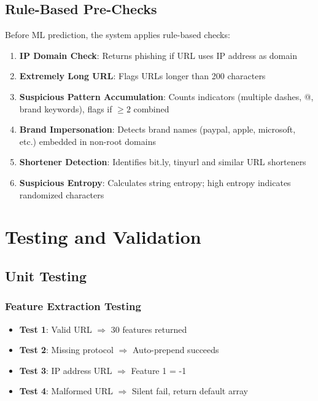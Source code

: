 \documentclass[12pt,a4paper]{report}
\begin{document}
\section{Rule-Based Pre-Checks}

Before ML prediction, the system applies rule-based checks:

\begin{enumerate}[leftmargin=*]
    \item \textbf{IP Domain Check}: Returns phishing if URL uses IP address as domain
    \item \textbf{Extremely Long URL}: Flags URLs longer than 200 characters
    \item \textbf{Suspicious Pattern Accumulation}: Counts indicators (multiple dashes, @, brand keywords), flags if $\geq 2$ combined
    \item \textbf{Brand Impersonation}: Detects brand names (paypal, apple, microsoft, etc.) embedded in non-root domains
    \item \textbf{Shortener Detection}: Identifies bit.ly, tinyurl and similar URL shorteners
    \item \textbf{Suspicious Entropy}: Calculates string entropy; high entropy indicates randomized characters
\end{enumerate}

\chapter{Testing and Validation}

\section{Unit Testing}

\subsection{Feature Extraction Testing}
\begin{itemize}[leftmargin=*]
    \item \textbf{Test 1}: Valid URL $\Rightarrow$ 30 features returned
    \item \textbf{Test 2}: Missing protocol $\Rightarrow$ Auto-prepend succeeds
    \item \textbf{Test 3}: IP address URL $\Rightarrow$ Feature 1 = -1
    \item \textbf{Test 4}: Malformed URL $\Rightarrow$ Silent fail, return default array
\end{itemize}
\end{document}
